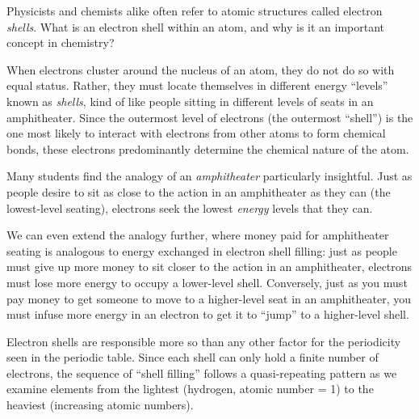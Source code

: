 

Physicists and chemists alike often refer to atomic structures called electron {\it shells}.  What is an electron shell within an atom, and why is it an important concept in chemistry?







When electrons cluster around the nucleus of an atom, they do not do so with equal status.  Rather, they must locate themselves in different energy ``levels'' known as {\it shells}, kind of like people sitting in different levels of seats in an amphitheater.  Since the outermost level of electrons (the outermost ``shell'') is the one most likely to interact with electrons from other atoms to form chemical bonds, these electrons predominantly determine the chemical nature of the atom.

\vskip 10pt

Many students find the analogy of an {\it amphitheater} particularly insightful.  Just as people desire to sit as close to the action in an amphitheater as they can (the lowest-level seating), electrons seek the lowest {\it energy} levels that they can.  

We can even extend the analogy further, where money paid for amphitheater seating is analogous to energy exchanged in electron shell filling: just as people must give up more money to sit closer to the action in an amphitheater, electrons must lose more energy to occupy a lower-level shell.  Conversely, just as you must pay money to get someone to move to a higher-level seat in an amphitheater, you must infuse more energy in an electron to get it to ``jump'' to a higher-level shell.







Electron shells are responsible more so than any other factor for the periodicity seen in the periodic table.  Since each shell can only hold a finite number of electrons, the sequence of ``shell filling'' follows a quasi-repeating pattern as we examine elements from the lightest (hydrogen, atomic number = 1) to the heaviest (increasing atomic numbers).




